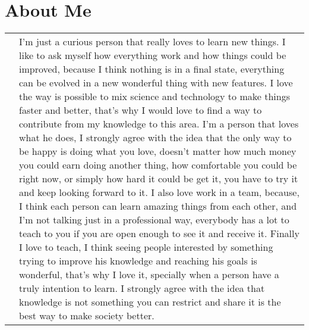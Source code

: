 \documentclass[a4paper,11pt]{article} %
\begin{document}
\section{About Me}
\begin{tabular}{r|p{11cm}}
& \footnotesize{I'm just a curious person that really loves to learn new things. I like to ask myself how everything work and how things could be improved, because I think nothing is in a final state, everything can be evolved in a new wonderful thing with new features.
\newline
\newline
I love the way is possible to mix science and technology to make things faster and better, that's why I would love to find a way to contribute from my knowledge to this area.
\newline
\newline
I'm a person that loves what he does, I strongly agree with the idea that the only way to be happy is doing what you love, doesn't matter how much money you could earn doing another thing, how comfortable you could be right now, or simply how hard it could be get it, you have to try it and keep looking forward to it.
\newline
\newline
I also love work in a team, because, I think each person can learn amazing things from each other, and I'm not talking just in a professional way, everybody has a lot to teach to you if you are open enough to see it and receive it.
\newline
\newline
Finally I love to teach, I think seeing people interested by something trying to improve his knowledge and reaching his goals is wonderful, that's why I love it, specially when a person have a truly intention to learn. I strongly agree with the idea that knowledge is not something you can restrict and share it is the best way to make society better.}
\end{tabular}
\fi


\end{document}
